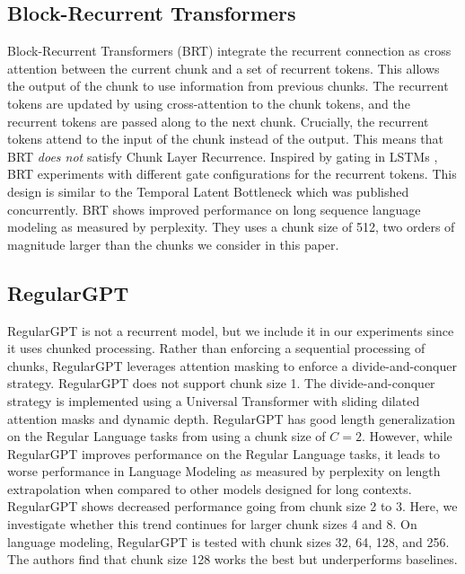     
    \subsection{Block-Recurrent Transformers}
    Block-Recurrent Transformers (BRT) \citep{hutchins_block-recurrent_2022} integrate the recurrent connection as cross attention between the current chunk and a set of recurrent tokens. This allows the output of the chunk to use information from previous chunks. The recurrent tokens are updated by using cross-attention to the chunk tokens, and the recurrent tokens are passed along to the next chunk. Crucially, the recurrent tokens attend to the input of the chunk instead of the output. This means that BRT \textit{does not} satisfy Chunk Layer Recurrence. Inspired by gating in LSTMs \citep{hochreiter_long_1997}, BRT experiments with different gate configurations for the recurrent tokens. This design is similar to the Temporal Latent Bottleneck \citep{didolkar_temporal_2022} which was published concurrently. BRT shows improved performance on long sequence language modeling as measured by perplexity. They uses a chunk size of 512, two orders of magnitude larger than the chunks we consider in this paper.
    
    \subsection{RegularGPT}
    RegularGPT \citep{chi_transformer_2023} is not a recurrent model, but we include it in our experiments since it uses chunked processing. Rather than enforcing a sequential processing of chunks, RegularGPT leverages attention masking to enforce a divide-and-conquer strategy. RegularGPT does not support chunk size 1. The divide-and-conquer strategy is implemented using a Universal Transformer with sliding dilated attention masks and dynamic depth. RegularGPT has good length generalization on the Regular Language tasks from \citep{deletang_neural_2022} using a chunk size of $C=2$. However, while RegularGPT improves performance on the Regular Language tasks, it leads to worse performance in Language Modeling as measured by perplexity on length extrapolation when compared to other models designed for long contexts. RegularGPT shows decreased performance going from chunk size 2 to 3. Here, we investigate whether this trend continues for larger chunk sizes 4 and 8. On language modeling, RegularGPT is tested with chunk sizes 32, 64, 128, and 256. The authors find that chunk size 128 works the best but underperforms baselines.
    

